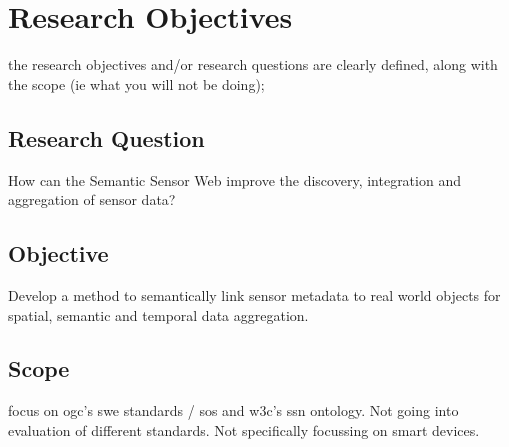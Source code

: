
\chapter{Research Objectives}
\label{chap:objectives}

the research objectives and/or research questions are clearly defined, along with the scope (ie what you will not be doing);

\section{Research Question} 
How can the Semantic Sensor Web improve the discovery, integration and aggregation of sensor data?



\section{Objective} 
Develop a method to semantically link sensor metadata to real world objects for spatial, semantic and temporal data aggregation.


\section{Scope} 
focus on \ac{ogc}'s \ac{swe} standards / \ac{sos} and \ac{w3c}'s \ac{ssn} ontology. Not going into evaluation of different standards. Not specifically focussing on smart devices.
